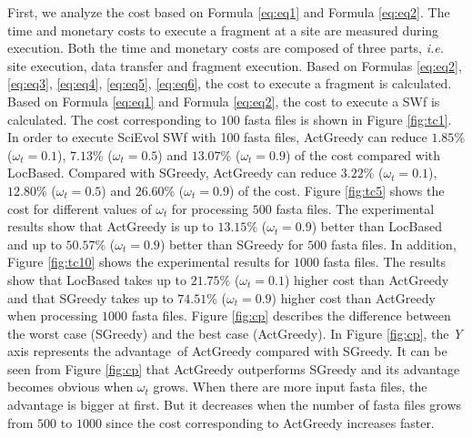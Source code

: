 First, we analyze the cost based on Formula \ref{eq:eq1} and Formula \ref{eq:eq2}.
The time and monetary costs to execute a fragment at a site are measured during execution. Both the time and monetary costs are composed of three parts, \textit{i.e.} site execution, data transfer and fragment execution. Based on Formulas \ref{eq:eq2}, \ref{eq:eq3}, \ref{eq:eq4}, \ref{eq:eq5}, \ref{eq:eq6}, the cost to execute a fragment is calculated. Based on Formula \ref{eq:eq1} and Formula \ref{eq:eq2}, the cost to execute a SWf is calculated. 
The cost corresponding to $100$ fasta files is shown in Figure \ref{fig:tc1}. In order to execute SciEvol SWf with 100 fasta files, ActGreedy can reduce $1.85$\% ($\omega_t=0.1$), $7.13$\% ($\omega_t=0.5$) and $13.07$\% ($\omega_t=0.9$) of the cost compared with LocBased. Compared with SGreedy, ActGreedy can reduce $3.22$\% ($\omega_t=0.1$), $12.80$\% ($\omega_t=0.5$) and $26.60$\% ($\omega_t=0.9$) of the cost. Figure \ref{fig:tc5} shows the cost for different values of $\omega_t$ for processing $500$ fasta files. The experimental results show that ActGreedy is up to $13.15\%$ ($\omega_t=0.9$) better than LocBased and up to $50.57\%$ ($\omega_t=0.9$) better than SGreedy for $500$ fasta files. In addition, Figure \ref{fig:tc10} shows the experimental results for $1000$ fasta files. The results show that LocBased takes up to $21.75\%$ ($\omega_t=0.1$) higher cost than ActGreedy and that SGreedy takes up to $74.51\%$ ($\omega_t=0.9$) higher cost than ActGreedy when processing $1000$ fasta files. Figure \ref{fig:cp} describes the difference between the worst case (SGreedy) and the best case (ActGreedy). In Figure \ref{fig:cp}, the \textit{Y} axis represents the advantage\footnotemark ~of ActGreedy compared with SGreedy. It can be seen from Figure \ref{fig:cp} that ActGreedy outperforms SGreedy and its advantage becomes obvious when $\omega_t$ grows. When there are more input fasta files, the advantage is bigger at first. But it decreases when the number of fasta files grows from $500$ to $1000$ since the cost corresponding to ActGreedy increases faster.


